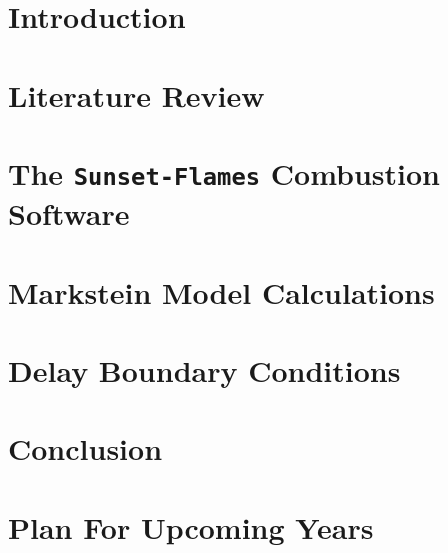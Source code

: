 \documentclass[lmr,second,hyperref,rgb,hyperref,dvipsnames]{uom_thesis_casson}
\title{\xmp@Title}
\author{\xmp@Author}
\begin{document}
\maketitle



\uomtoc

\uomstartmainbody %


\chapter{Introduction} \label{ch:intro}


\chapter{Literature Review} \label{ch:lit-review}


\chapter{The \texttt{Sunset-Flames} Combustion Software} \label{ch:sunset}


\chapter{Markstein Model Calculations} \label{ch:markstein}


\chapter{Delay Boundary Conditions} \label{ch:delay-bcs}


\chapter{Conclusion} \label{ch:conc}


\chapter{Plan For Upcoming Years} \label{ch:plan}



\printbibliography[title={References},heading=bibintoc]
\end{document}
